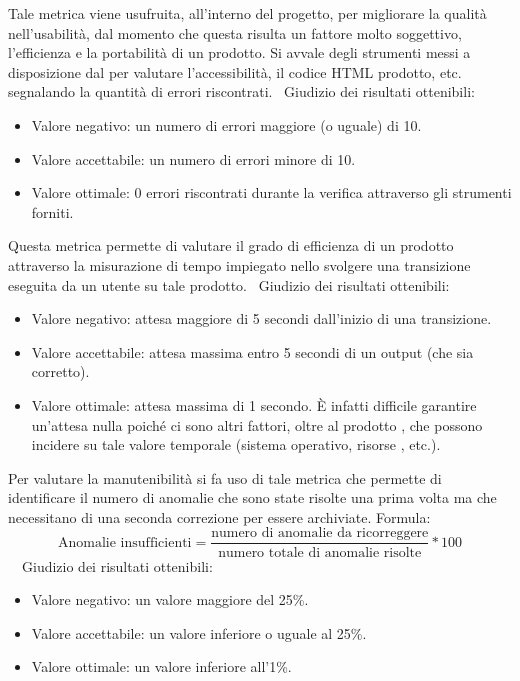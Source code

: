 \documentclass[a4paper, titlepage]{article}
\begin{document}
\label{par:web}
Tale metrica viene usufruita, all'interno del progetto, per migliorare la qualità nell'usabilità, dal momento che questa risulta un fattore molto soggettivo, l'efficienza e la portabilità di un prodotto.
Si avvale degli strumenti messi a disposizione dal  per valutare l'accessibilità, il codice HTML prodotto, etc. segnalando la quantità di errori riscontrati.
\
\newline Giudizio dei risultati ottenibili:
\begin{itemize}
\item Valore negativo: un numero di errori maggiore (o uguale) di 10.
\item Valore accettabile: un numero di errori minore di 10.
\item Valore ottimale: 0 errori riscontrati durante la verifica attraverso gli strumenti forniti.
\end{itemize}

\label{par:greff}
Questa metrica permette di valutare il grado di efficienza di un prodotto attraverso la misurazione di tempo impiegato nello svolgere una transizione eseguita da un utente su tale prodotto.
\
\newline Giudizio dei risultati ottenibili:
\begin{itemize}
\item Valore negativo: attesa maggiore di 5 secondi dall'inizio di una transizione.
\item Valore accettabile: attesa massima entro 5 secondi di un output (che sia corretto).
\item Valore ottimale: attesa massima di 1 secondo. È infatti difficile garantire un'attesa nulla poiché ci sono altri fattori, oltre al prodotto , che possono incidere su tale valore temporale (sistema operativo, risorse , etc.). 
\end{itemize}

\label{par:anins}
Per valutare la manutenibilità si fa uso di tale metrica che permette di identificare il numero di anomalie che sono state risolte una prima volta ma che necessitano di una seconda correzione per essere archiviate.
\newline Formula:
\begin{displaymath}
\mbox{Anomalie insufficienti}=\frac{\mbox{numero di anomalie da ricorreggere}}{\mbox{numero totale di anomalie risolte}}*100
\end{displaymath}
\
\
\newline Giudizio dei risultati ottenibili:
\begin{itemize}
\item Valore negativo: un valore maggiore del 25\%.
\item Valore accettabile: un valore inferiore o uguale al 25\%.
\item Valore ottimale: un valore inferiore all'1\%.
\end{itemize}
\end{document}
